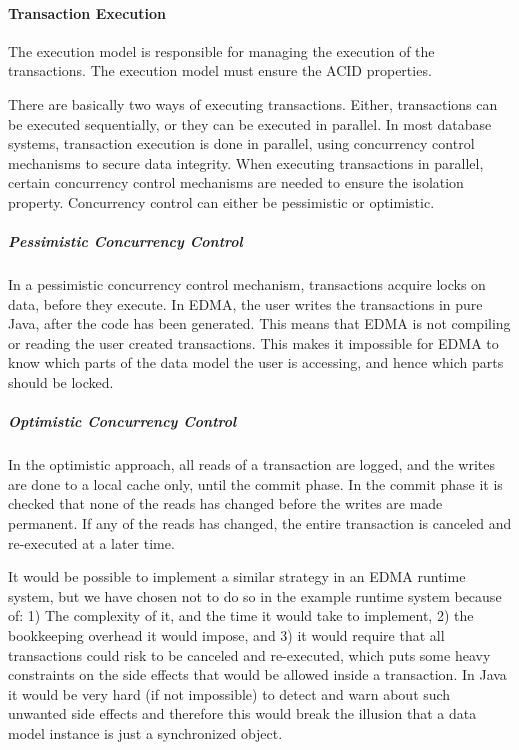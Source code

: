 \paragraph{Transaction Execution}

The execution model is responsible for managing the execution of the
transactions. The execution model must ensure the ACID properties.

There are basically two ways of executing transactions. Either, transactions
can be executed sequentially, or they can be executed in parallel.
In most database systems, transaction execution is done in parallel,
using concurrency control mechanisms to secure data integrity. When
executing transactions in parallel, certain concurrency control mechanisms
are needed to ensure the isolation property. Concurrency control can
either be pessimistic or optimistic. 


\subparagraph{Pessimistic Concurrency Control}

In a pessimistic concurrency control mechanism, transactions acquire
locks on data, before they execute. In EDMA, the user writes the transactions
in pure Java, after the code has been generated. This means that EDMA
is not compiling or reading the user created transactions. This makes
it impossible for EDMA to know which parts of the data model the user
is accessing, and hence which parts should be locked.


\subparagraph{Optimistic Concurrency Control}

In the optimistic approach, all reads of a transaction are logged,
and the writes are done to a local cache only, until the commit phase.
In the commit phase it is checked that none of the reads has changed
before the writes are made permanent. If any of the reads has changed,
the entire transaction is canceled and re-executed at a later time.

It would be possible to implement a similar strategy in an EDMA runtime
system, but we have chosen not to do so in the example runtime system
because of: 1) The complexity of it, and the time it would take to
implement, 2) the bookkeeping overhead it would impose, and 3) it
would require that all transactions could risk to be canceled and
re-executed, which puts some heavy constraints on the side effects
that would be allowed inside a transaction. In Java it would be very
hard (if not impossible) to detect and warn about such unwanted side
effects and therefore this would break the illusion that a data model
instance is just a synchronized object.


